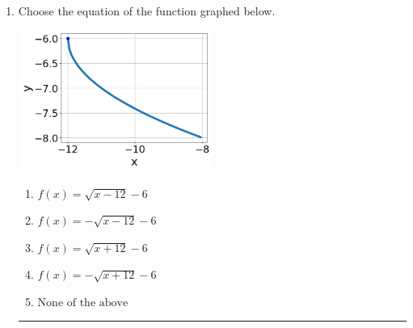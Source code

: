 \documentclass[14pt]{extbook}
\newcommand{\litem}[1]{\item#1\hspace*{-1cm}\rule{\textwidth}{0.4pt}}
\begin{document}
\begin{enumerate}
\litem{
Choose the equation of the function graphed below.
\begin{center}
    \includegraphics[width=0.5\textwidth]{../Figures/radicalGraphToEquationCopyC.png}
\end{center}
\begin{enumerate}[label=\Alph*.]
\item \( f(x) = \sqrt{x - 12} - 6 \)
\item \( f(x) = - \sqrt{x - 12} - 6 \)
\item \( f(x) = \sqrt{x + 12} - 6 \)
\item \( f(x) = - \sqrt{x + 12} - 6 \)
\item \( \text{None of the above} \)


\end{enumerate}}
\end{enumerate}
\end{document}
